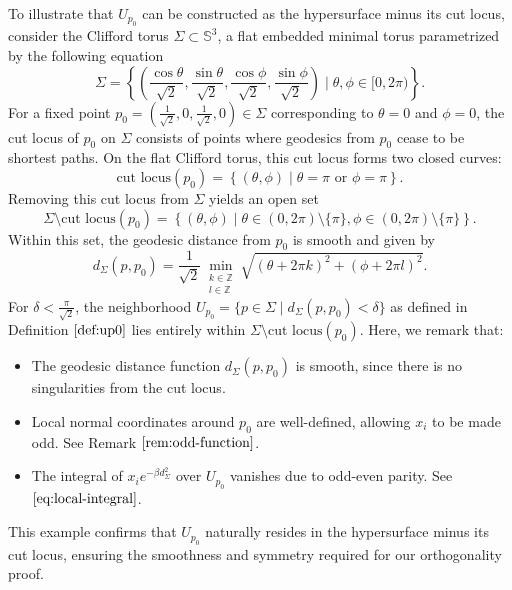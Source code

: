 \documentclass[a4, 12pt]{amsart}
\numberwithin{equation}{section} \numberwithin{equation}{section}
\begin{document}
To illustrate that $U_{p_0}$ can be constructed as the hypersurface minus its cut locus, consider the Clifford torus $\Sigma \subset \mathbb{S}^3$, a flat embedded minimal torus parametrized by the following equation
\begin{equation*}
\Sigma = \left\{ \left( \frac{\cos\theta}{\sqrt{2}}, \frac{\sin\theta}{\sqrt{2}}, \frac{\cos\phi}{\sqrt{2}}, \frac{\sin\phi}{\sqrt{2}} \right) \mid \theta, \phi \in [0, 2\pi) \right\}.
\end{equation*}
For a fixed point $p_0 = \left( \frac{1}{\sqrt{2}}, 0, \frac{1}{\sqrt{2}}, 0 \right) \in \Sigma$ corresponding to $\theta = 0$ and $\phi = 0$, the cut locus of $p_0$ on $\Sigma$ consists of points where geodesics from $p_0$ cease to be shortest paths. On the flat Clifford torus, this cut locus forms two closed curves:
\begin{equation*}
\text{cut locus}(p_0) = \left\{ (\theta, \phi) \mid \theta = \pi \text{ or } \phi = \pi \right\}.
\end{equation*}
Removing this cut locus from $\Sigma$ yields an open set
\begin{equation*}
\Sigma \setminus \text{cut locus}(p_0) = \left\{ (\theta, \phi) \mid \theta \in (0, 2\pi) \setminus \{\pi\}, \phi \in (0, 2\pi) \setminus \{\pi\} \right\}.
\end{equation*}
Within this set, the geodesic distance from $p_0$ is smooth and given by
\begin{equation*}
d_{\Sigma}(p, p_0) = \frac{1}{\sqrt{2}} \min_{\substack{k \in \mathbb{Z} \\ l \in \mathbb{Z}}} \sqrt{(\theta + 2\pi k)^2 + (\phi + 2\pi l)^2}.
\end{equation*}
For $\delta < \frac{\pi}{\sqrt{2}}$, the neighborhood $U_{p_0} = \{ p \in \Sigma \mid d_{\Sigma}(p, p_0) < \delta \}$ as defined in  Definition $\ref{def:up0}$ lies entirely within $\Sigma \setminus \text{cut locus}(p_0)$. Here, we remark that:\begin{itemize}
\item[(i)] The geodesic distance function $d_{\Sigma}(p, p_0)$ is smooth, since there is no singularities from the cut locus.
\item[(ii)] Local normal coordinates around $p_0$ are well-defined, allowing $x_i$ to be made odd. See Remark $\ref{rem:odd-function}$.
\item[(iii)] The integral of $x_i e^{-\beta d_{\Sigma}^2}$ over $U_{p_0}$ vanishes due to odd-even parity. See $\eqref{eq:local-integral}$.
\end{itemize}
This example confirms that $U_{p_0}$ naturally resides in the hypersurface minus its cut locus, ensuring the smoothness and symmetry required for our orthogonality proof.
\end{document}
